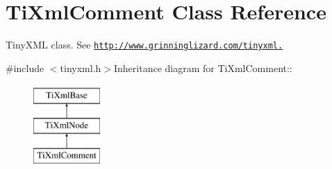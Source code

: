 \hypertarget{class_ti_xml_comment}{
\section{TiXmlComment Class Reference}
\label{class_ti_xml_comment}
}


TinyXML class. See \href{http://www.grinninglizard.com/tinyxml.}{\tt http://www.grinninglizard.com/tinyxml.}  


{\ttfamily \#include $<$tinyxml.h$>$}Inheritance diagram for TiXmlComment::\begin{figure}[H]
\begin{center}
\leavevmode
\includegraphics[height=3cm]{class_ti_xml_comment}
\end{center}
\end{figure}
